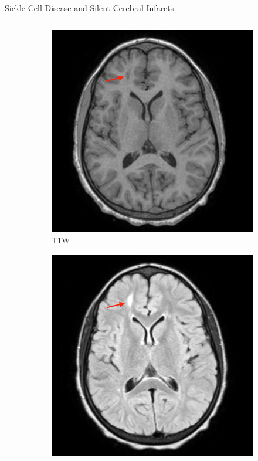 \documentclass[]{standalone}
\begin{document}
\begin{frame}{Sickle Cell Disease and Silent Cerebral Infarcts}{}
\begin{columns}
		\begin{column}{0.8\textwidth}
			\begin{figure}[h!]
				\centering
				\begin{subfigure}[b]{0.4\textwidth}
				\centering
					\includegraphics[scale=0.068]{./IMG/Lesion_T1.png}
					\caption*{T1W}
				\end{subfigure} 
				\hspace{20pt}
				\begin{subfigure}[b]{0.4\textwidth}
				\centering
					\includegraphics[scale=0.068]{./IMG/Lesion_flair.png}

\end{subfigure}
\end{figure}
\end{column}
\end{columns}
\end{frame}
\end{document}
